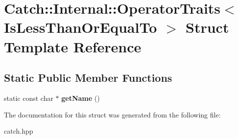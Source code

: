 \hypertarget{structCatch_1_1Internal_1_1OperatorTraits_3_01IsLessThanOrEqualTo_01_4}{}\section{Catch\+:\+:Internal\+:\+:Operator\+Traits$<$ Is\+Less\+Than\+Or\+Equal\+To $>$ Struct Template Reference}
\label{structCatch_1_1Internal_1_1OperatorTraits_3_01IsLessThanOrEqualTo_01_4}
\subsection*{Static Public Member Functions}
\begin{DoxyCompactItemize}
\item 
\mbox{\label{structCatch_1_1Internal_1_1OperatorTraits_3_01IsLessThanOrEqualTo_01_4_ae8578813bc847838f10448c1541a9d7b}} 
static const char $\ast$ {\bfseries get\+Name} ()
\end{DoxyCompactItemize}


The documentation for this struct was generated from the following file\+:\begin{DoxyCompactItemize}
\item 
catch.\+hpp\end{DoxyCompactItemize}
